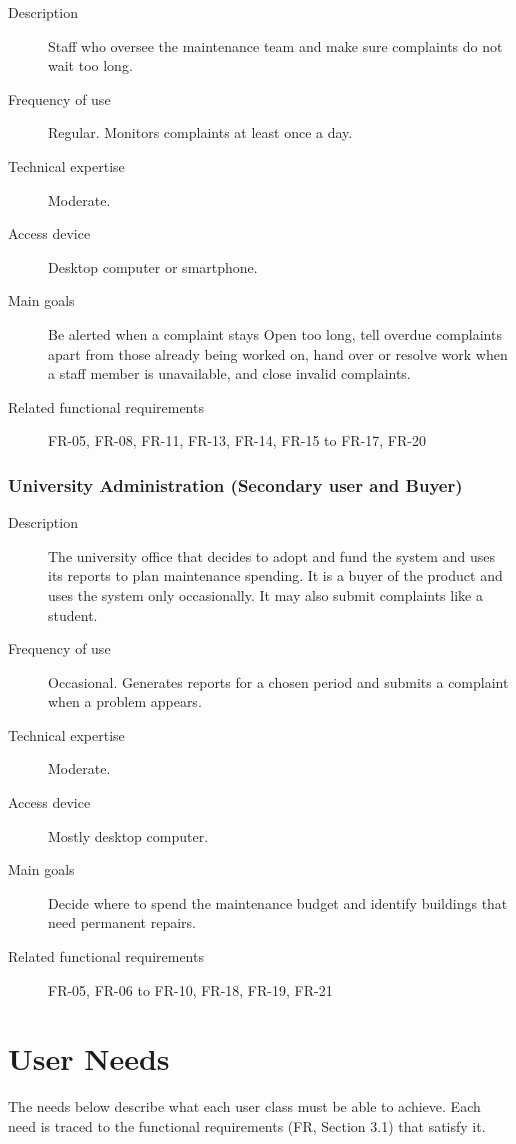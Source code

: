 \begin{description}
  \item[Description] Staff who oversee the maintenance team and make sure complaints do not wait too long.
  \item[Frequency of use] Regular. Monitors complaints at least once a day.
  \item[Technical expertise] Moderate.
  \item[Access device] Desktop computer or smartphone.
  \item[Main goals] Be alerted when a complaint stays Open too long, tell overdue complaints apart from those already being worked on, hand over or resolve work when a staff member is unavailable, and close invalid complaints.
  \item[Related functional requirements] FR-05, FR-08, FR-11, FR-13, FR-14, FR-15 to FR-17, FR-20
\end{description}

\subsubsection*{University Administration (Secondary user and Buyer)}

\begin{description}
  \item[Description] The university office that decides to adopt and fund the system and uses its reports to plan maintenance spending. It is a buyer of the product and uses the system only occasionally. It may also submit complaints like a student.
  \item[Frequency of use] Occasional. Generates reports for a chosen period and submits a complaint when a problem appears.
  \item[Technical expertise] Moderate.
  \item[Access device] Mostly desktop computer.
  \item[Main goals] Decide where to spend the maintenance budget and identify buildings that need permanent repairs.
  \item[Related functional requirements] FR-05, FR-06 to FR-10, FR-18, FR-19, FR-21
\end{description}

\section{User Needs}
The needs below describe what each user class must be able to achieve. Each need is traced to the functional requirements (FR, Section 3.1) that satisfy it.

